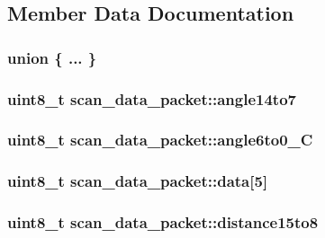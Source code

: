 \subsection{Member Data Documentation}
\hypertarget{structscan__data__packet_a4f10bb28fada5dc58732724f356e68d2}{\subsubsection[{"@13}]{\setlength{\rightskip}{0pt plus 5cm}union \{ ... \} }}\label{structscan__data__packet_a4f10bb28fada5dc58732724f356e68d2}
\hypertarget{structscan__data__packet_a614148a4a3e77048b6dd004e6e37c858}{
\subsubsection[{angle14to7}]{\setlength{\rightskip}{0pt plus 5cm}uint8\-\_\-t scan\-\_\-data\-\_\-packet\-::angle14to7}}\label{structscan__data__packet_a614148a4a3e77048b6dd004e6e37c858}
\hypertarget{structscan__data__packet_afa912fe10cbd68a6b8a60df2a1faa3ba}{
\subsubsection[{angle6to0\-\_\-\-C}]{\setlength{\rightskip}{0pt plus 5cm}uint8\-\_\-t scan\-\_\-data\-\_\-packet\-::angle6to0\-\_\-\-C}}\label{structscan__data__packet_afa912fe10cbd68a6b8a60df2a1faa3ba}
\hypertarget{structscan__data__packet_ab2de61ce3719327366ee913c9a6b58fc}{
\subsubsection[{data}]{\setlength{\rightskip}{0pt plus 5cm}uint8\-\_\-t scan\-\_\-data\-\_\-packet\-::data\mbox{[}5\mbox{]}}}\label{structscan__data__packet_ab2de61ce3719327366ee913c9a6b58fc}
\hypertarget{structscan__data__packet_ae144f4bb4a3022fdfdb513959f0fd668}{
\subsubsection[{distance15to8}]{\setlength{\rightskip}{0pt plus 5cm}uint8\-\_\-t scan\-\_\-data\-\_\-packet\-::distance15to8}}\label{structscan__data__packet_ae144f4bb4a3022fdfdb513959f0fd668}
